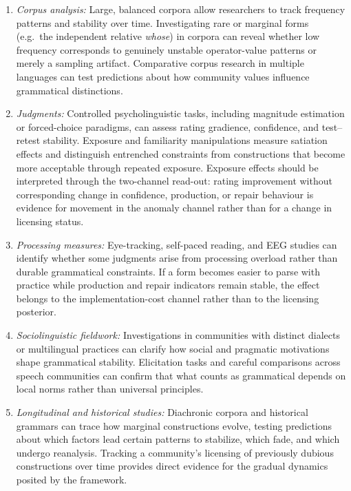 \documentclass[12pt,letterpaper]{article}
\newcommand{\mention}[1]{\textit{#1}}
\begin{document}
\begin{enumerate}
\item \emph{Corpus analysis:} Large, balanced corpora allow researchers to track frequency patterns and stability over time. Investigating rare or marginal forms (e.g.\ the independent relative \mention{whose}) in corpora can reveal whether low frequency corresponds to genuinely unstable operator-value patterns or merely a sampling artifact. Comparative corpus research in multiple languages can test predictions about how community values influence grammatical distinctions.

\item \emph{Judgments:} Controlled psycholinguistic tasks, including
magnitude estimation or forced-choice paradigms, can assess rating gradience,
confidence, and test--retest stability. Exposure and familiarity manipulations
measure satiation effects and distinguish entrenched constraints from
constructions that become more acceptable through repeated exposure. Exposure
effects should be interpreted through the two-channel read-out: rating
improvement without corresponding change in confidence, production, or repair
behaviour is evidence for movement in the anomaly channel rather than for a
change in licensing status.

\item \emph{Processing measures:} Eye-tracking, self-paced reading, and EEG
studies can identify whether some judgments arise from processing overload
rather than durable grammatical constraints. If a form becomes easier to parse
with practice while production and repair indicators remain stable, the effect
belongs to the implementation-cost channel rather than to the licensing
posterior.

\item \emph{Sociolinguistic fieldwork:} Investigations in communities with distinct dialects or multilingual practices can clarify how social and pragmatic motivations shape grammatical stability. Elicitation tasks and careful comparisons across speech communities can confirm that what counts as grammatical depends on local norms rather than universal principles.

\item \emph{Longitudinal and historical studies:} Diachronic corpora and historical grammars can trace how marginal constructions evolve, testing predictions about which factors lead certain patterns to stabilize, which fade, and which undergo reanalysis. Tracking a community's licensing of previously dubious constructions over time provides direct evidence for the gradual dynamics posited by the framework.


\end{enumerate}
\end{document}
